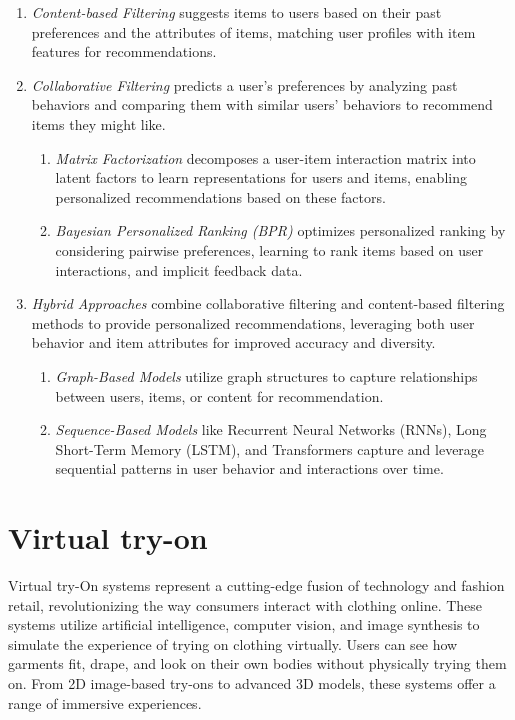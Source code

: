			\begin{enumerate}
				\item \textit{Content-based Filtering} suggests items to users based on their past preferences and the attributes of items, matching user profiles with item features for recommendations.
				\item \textit{Collaborative Filtering} predicts a user's preferences by analyzing past behaviors and comparing them with similar users' behaviors to recommend items they might like.
					\begin{enumerate}
						\item \textit{Matrix Factorization} decomposes a user-item interaction matrix into latent factors to learn representations for users and items, enabling personalized recommendations based on these factors.
						\item \textit{Bayesian Personalized Ranking (BPR)} optimizes personalized ranking by considering pairwise preferences, learning to rank items based on user interactions, and implicit feedback data.
					\end{enumerate}
				\item \textit{Hybrid Approaches} combine collaborative filtering and content-based filtering methods to provide personalized recommendations, leveraging both user behavior and item attributes for improved accuracy and diversity.
					\begin{enumerate}
						\item \textit{Graph-Based Models} utilize graph structures to capture relationships between users, items, or content for recommendation.
						\item \textit{Sequence-Based Models} like Recurrent Neural Networks (RNNs), Long Short-Term Memory (LSTM), and Transformers capture and leverage sequential patterns in user behavior and interactions over time.
					\end{enumerate}
			\end{enumerate}

\section{Virtual try-on}	
    Virtual try-On systems represent a cutting-edge fusion of technology and fashion retail, revolutionizing the way consumers interact with clothing online. These systems utilize artificial intelligence, computer vision, and image synthesis to simulate the experience of trying on clothing virtually. Users can see how garments fit, drape, and look on their own bodies without physically trying them on. From 2D image-based try-ons to advanced 3D models, these systems offer a range of immersive experiences.
        
